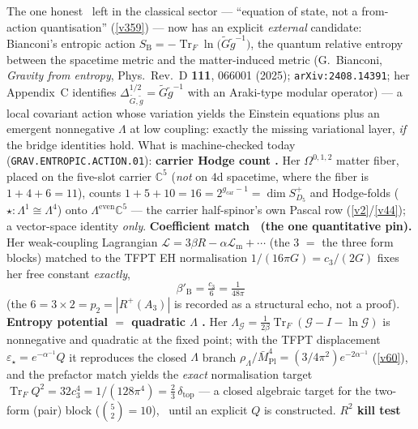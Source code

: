 \documentclass[11pt,a4paper]{article}
\newcommand{\cthree}{c_3}
\newcommand{\Mpl}{\bar M_{\mathrm{Pl}}}
\newcommand{\gcar}{g_{\mathrm{car}}}
\begin{document}
\begin{keybox}
The one honest \mO\ left in the classical sector --- ``equation of state, not a from-action quantisation''
(\vref{v359}) --- now has an explicit \emph{external} candidate: Bianconi's entropic action
$S_{\mathrm B}=-\operatorname{Tr}_F\ln\bigl(\widetilde G\widetilde g^{-1}\bigr)$, the quantum relative
entropy between the spacetime metric and the matter-induced metric
(G.~Bianconi, \emph{Gravity from entropy}, Phys.\ Rev.\ D \textbf{111}, 066001 (2025);
\texttt{arXiv:2408.14391}; her Appendix~C identifies $\Delta^{1/2}_{\widetilde G,\widetilde g}
=\widetilde G\widetilde g^{-1}$ with an Araki-type modular operator) --- a local covariant action whose
variation yields the Einstein equations plus an emergent nonnegative $\Lambda$ at low coupling: exactly the
missing variational layer, \emph{if} the bridge identities hold. What is machine-checked today
(\texttt{GRAV.ENTROPIC.ACTION.01}): \textbf{carrier Hodge count \mE.} Her $\Omega^{0,1,2}$ matter fiber,
placed on the five-slot carrier $\mathbb C^5$ (\emph{not} on $4$d spacetime, where the fiber is
$1{+}4{+}6{=}11$), counts $1{+}5{+}10{=}16{=}2^{\gcar-1}{=}\dim S^+_{D_5}$ and Hodge-folds
($\star:\Lambda^1{\cong}\Lambda^4$) onto $\Lambda^{\mathrm{even}}\mathbb C^5$ --- the carrier half-spinor's
own Pascal row (\vref{v2}/\vref{v44}); a vector-space identity \emph{only}. \textbf{Coefficient match \mE\
(the one quantitative pin).} Her weak-coupling Lagrangian $\mathcal L=3\beta R-\alpha\mathcal L_{\mathrm m}
+\cdots$ (the $3$ $=$ the three form blocks) matched to the TFPT EH normalisation
$1/(16\pi G)=\cthree/(2G)$ fixes her free constant \emph{exactly},
\[
  \boxed{\ \beta'_{\mathrm B}=\tfrac{\cthree}{6}=\tfrac1{48\pi}\ }
\]
(the $6=3\times2=p_2=|R^+(A_3)|$ is recorded as a structural echo, not a proof). \textbf{Entropy potential
$=$ quadratic $\Lambda$ \mE.} Her $\Lambda_{\mathcal G}=\tfrac1{2\beta}\operatorname{Tr}_F(\mathcal G-I-
\ln\mathcal G)$ is nonnegative and quadratic at the fixed point; with the TFPT displacement
$\varepsilon_\star=e^{-\alpha^{-1}}Q$ it reproduces the closed $\Lambda$ branch
$\rho_\Lambda/\Mpl^4=(3/4\pi^2)e^{-2\alpha^{-1}}$ (\vref{v60}), and the prefactor match yields the
\emph{exact} normalisation target $\operatorname{Tr}_FQ^2=32\cthree^4=1/(128\pi^4)=\tfrac23\,
\delta_{\mathrm{top}}$ --- a closed algebraic target for the two-form (pair) block
($\binom52{=}10$), \mC\ until an explicit $Q$ is constructed. \textbf{$R^2$ kill test \mE\
}
\end{keybox}
\end{document}

